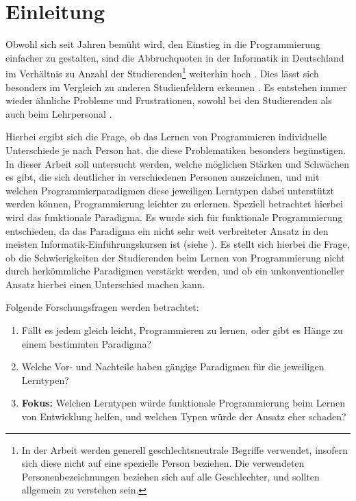 \clearpage
\section{Einleitung}
\label{sec:intro}

Obwohl sich seit Jahren bemüht wird, den Einstieg in die Programmierung einfacher zu gestalten, sind die Abbruchquoten in der Informatik in Deutschland im Verhältnis zu Anzahl der Studierenden\footnote{In der Arbeit werden generell geschlechtsneutrale Begriffe verwendet, insofern sich diese nicht auf eine spezielle Person beziehen. Die verwendeten Personenbezeichnungen beziehen sich auf alle Geschlechter, und sollten allgemein zu verstehen sein.} weiterhin hoch \cite{destatis}. Dies lässt sich besonders im Vergleich zu anderen Studienfeldern erkennen \cite{dhzw}.
Es entstehen immer wieder ähnliche Probleme und Frustrationen, sowohl bei den Studierenden als auch beim Lehrpersonal \cite{mcdonald}.

Hierbei ergibt sich die Frage, ob das Lernen von Programmieren individuelle Unterschiede je nach Person hat, die diese Problematiken besonders begünstigen. In dieser Arbeit soll untersucht werden, welche möglichen Stärken und Schwächen es gibt, die sich deutlicher in verschiedenen Personen auszeichnen, und mit welchen Programmierparadigmen diese jeweiligen Lerntypen dabei unterstützt werden können, Programmierung leichter zu erlernen.
Speziell betrachtet hierbei wird das funktionale Paradigma. Es wurde sich für funktionale Programmierung entschieden, da das Paradigma ein nicht sehr weit verbreiteter Ansatz in den meisten Informatik-Einführungskursen ist (siehe ). Es stellt sich hierbei die Frage, ob die Schwierigkeiten der Studierenden beim Lernen von Programmierung nicht durch herkömmliche Paradigmen verstärkt werden, und ob ein unkonventioneller Ansatz hierbei einen Unterschied machen kann.

Folgende Forschungsfragen werden betrachtet:

\begin{enumerate}
    \item Fällt es jedem gleich leicht, Programmieren zu lernen, oder gibt es Hänge zu einem bestimmten Paradigma?
    \item Welche Vor- und Nachteile haben gängige Paradigmen für die jeweiligen Lerntypen?
    \item \textbf{Fokus:} Welchen Lerntypen würde funktionale Programmierung beim Lernen von Entwicklung helfen, und welchen Typen würde der Ansatz eher schaden?
\end{enumerate}
